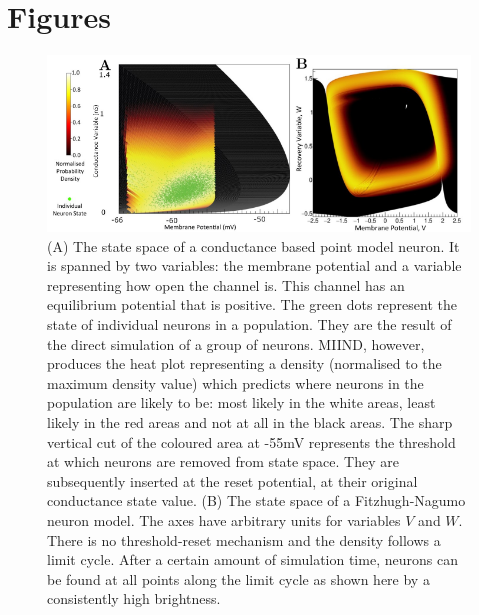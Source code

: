 \documentclass[utf8]{frontiersSCNS} %
\begin{document}
\clearpage

\section*{Figures}


\begin{figure}[htb!]
  \centering
    \includegraphics[width=\linewidth]{images/cloud_full_figure.pdf}
  \caption{(A) The state space of a conductance based point model neuron. It is spanned by two variables: the membrane potential and a variable representing how open the channel is. This channel has an equilibrium potential that is positive. The green dots represent the state of individual neurons in a population. They are the result of the direct simulation of a group of neurons. MIIND, however, produces the heat plot representing a density (normalised to the maximum density value) which predicts where neurons in the population are likely to be: most likely in the white areas, least likely in  the red areas and not at all in the black areas. The sharp vertical cut of the coloured area at -55mV represents the threshold at which neurons are removed from state space. They are subsequently inserted at the reset potential, at their original conductance state value. (B) The state space of a Fitzhugh-Nagumo neuron model. The axes have arbitrary units for variables $V$ and $W$. There is no threshold-reset mechanism and the density follows a limit cycle. After a certain amount of simulation time, neurons can be found at all points along the limit cycle as shown here by a consistently high brightness.}
  \label{fig-cloud}
\end{figure}
\end{document}
